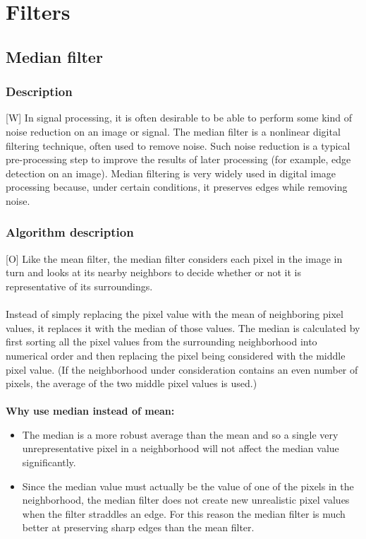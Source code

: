 \documentclass[12pt]{article}
\begin{document}
\section{Filters}
	
	\subsection{Median filter}
	\subsubsection{Description}
	[W] In signal processing, it is often desirable to be able to perform some kind of noise 
	reduction on an image or signal. The median filter is a nonlinear digital filtering 
	technique, often used to remove noise. Such noise reduction is a typical pre-processing 
	step to improve the results of later processing (for example, edge detection on an image). 
	Median filtering is very widely used in digital image processing because, under certain 
	conditions, it preserves edges while removing noise.
	
	\subsubsection{Algorithm description}
	[O] Like the mean filter, the median filter considers each pixel in the image in turn and 
	looks at its nearby neighbors to decide whether or not it is representative of its surroundings.\\
	\\
	Instead of simply replacing the pixel value with the mean of neighboring pixel values, it replaces 
	it with the median of those values. The median is calculated by first sorting all the pixel values 
	from the surrounding neighborhood into numerical order and then replacing the pixel being considered 
	with the middle pixel value. (If the neighborhood under consideration contains an even number of 
	pixels, the average of the two middle pixel values is used.)\\
	\\
	\textbf{Why use median instead of mean:}
	\begin{itemize}
	
	\item The median is a more robust average than the mean and so a single very unrepresentative pixel
	in a neighborhood will not affect the median value significantly.

    \item Since the median value must actually be the value of one of the pixels in the neighborhood, 
    the median filter does not create new unrealistic pixel values when the filter straddles an edge. 
    For this reason the median filter is much better at preserving sharp edges than the mean filter. 
	\end{itemize}
\end{document}
